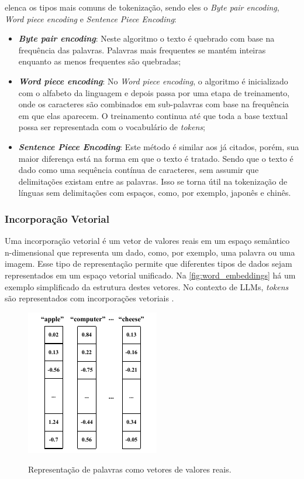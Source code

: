 \textcite{llm_survey_2024} elenca os tipos mais comuns de tokenização, sendo eles o \textit{Byte pair encoding}, \textit{Word piece encoding} e
\textit{Sentence Piece Encoding}:

\begin{itemize}
      \item \textbf{\textit{Byte pair encoding}}: Neste algoritmo o texto é quebrado com base na frequência das palavras. Palavras mais frequentes se mantém inteiras
            enquanto as menos frequentes são quebradas;
      \item \textbf{\textit{Word piece encoding}}: No \textit{Word piece encoding}, o algoritmo é inicializado com o alfabeto da linguagem e depois passa por uma etapa
            de treinamento, onde os caracteres são combinados em sub-palavras com base na frequência em que elas aparecem. O treinamento continua até que toda a base
            textual possa ser representada com o vocabulário de \textit{tokens};
      \item \textbf{\textit{Sentence Piece Encoding}}: Este método é similar aos já citados, porém, sua maior diferença está na forma em que o texto é tratado. Sendo
            que o texto é dado como uma sequência contínua de caracteres, sem assumir que delimitações existam entre as palavras. Isso se torna útil na tokenização de
            línguas sem delimitações com espaços, como, por exemplo, japonês e chinês.
\end{itemize}

\subsubsection{Incorporação Vetorial}

Uma incorporação vetorial é um vetor de valores reais em um espaço semântico n-dimensional que representa um dado, como, por exemplo, uma palavra ou uma imagem. Esse
tipo de representação permite que diferentes tipos de dados sejam representados em um espaço vetorial unificado. Na \autoref{fig:word_embeddings} há um exemplo
simplificado da estrutura destes vetores. No contexto de \acp{LLM}, \textit{tokens} são representados com incorporações vetoriais \cite{word_embedding, mllm_survey_2023}.

\begin{figure}[ht]
      \centering
      \caption{\small Representação de palavras como vetores de valores reais.}
      \includegraphics[width=0.3\columnwidth,keepaspectratio]{images/word_embeddings.pdf}
      \label{fig:word_embeddings}
\end{figure}

